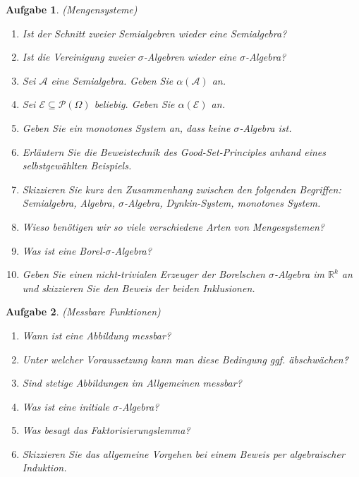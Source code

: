 \documentclass[11pt, a4paper, ngerman]{article}
\newcommand{\R}{\mathbb{R}}
\newtheorem{aufgabe}{Aufgabe}
\begin{document}
\begin{aufgabe} (Mengensysteme)
    \begin{enumerate}
        \item 
        Ist der Schnitt zweier Semialgebren wieder eine Semialgebra? 
        \item 
        Ist die Vereinigung zweier $\sigma$-Algebren wieder eine $\sigma$-Algebra? 
        \item 
        Sei $\mathcal{A}$ eine Semialgebra. Geben Sie $\alpha(\mathcal{A})$ an. 
        \item 
        Sei $\mathcal{E} \subseteq \mathcal{P}(\Omega)$ beliebig. Geben Sie $\alpha(\mathcal{E})$ an.
        \item 
        Geben Sie ein monotones System an, dass keine $\sigma$-Algebra ist. 
        \item 
        Erläutern Sie die Beweistechnik des Good-Set-Principles anhand eines selbstgewählten Beispiels.
        \item 
        Skizzieren Sie kurz den Zusammenhang zwischen den folgenden Begriffen: Semialgebra, Algebra, $\sigma$-Algebra, Dynkin-System, monotones System. 
        \item 
        Wieso benötigen wir so viele verschiedene Arten von Mengesystemen? 
        \item 
        Was ist eine Borel-$\sigma$-Algebra? 
        \item 
        Geben Sie einen nicht-trivialen Erzeuger der Borelschen $\sigma$-Algebra im $\R^k$ an und skizzieren Sie den Beweis der beiden Inklusionen. 
    \end{enumerate}
\end{aufgabe}

\begin{aufgabe} (Messbare Funktionen)
    \begin{enumerate}
        \item
        Wann ist eine Abbildung messbar? 
        \item 
        Unter welcher Voraussetzung kann man diese Bedingung ggf. \"abschwächen\"? 
        \item 
        Sind stetige Abbildungen im Allgemeinen messbar? 
        \item
        Was ist eine initiale $\sigma$-Algebra?
        \item 
        Was besagt das Faktorisierungslemma? 
        \item 
        Skizzieren Sie das allgemeine Vorgehen bei einem Beweis per algebraischer Induktion. 
    \end{enumerate}
    
\end{aufgabe}
\end{document}
